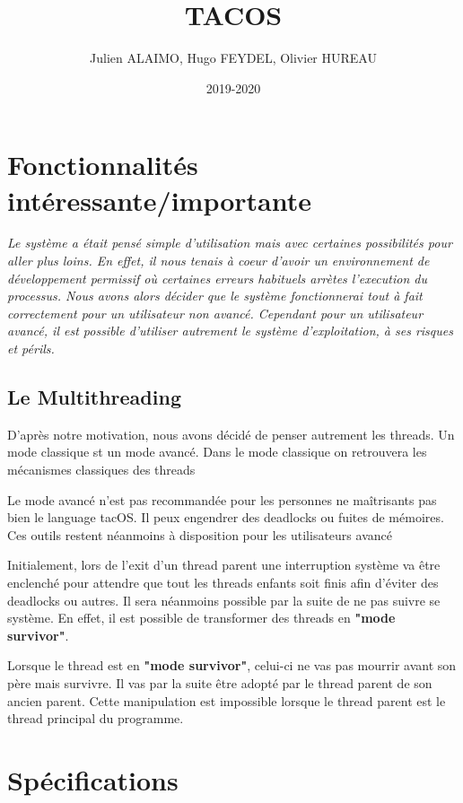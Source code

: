 \documentclass{article}
\title{TACOS}
\author{Julien ALAIMO, Hugo FEYDEL, Olivier HUREAU }
\date{2019-2020}
\begin{document}
\maketitle

\section{Fonctionnalités intéressante/importante}
\textit{
Le système a était pensé simple d'utilisation mais avec certaines possibilités pour aller plus loins. En effet, il nous tenais à coeur d'avoir un environnement de développement permissif où certaines erreurs habituels arrètes l'execution du processus. Nous avons alors décider que le système fonctionnerai tout à fait correctement pour un utilisateur non avancé. Cependant pour un utilisateur avancé, il est possible d'utiliser autrement le système d'exploitation, à ses risques et périls.
}

\subsection{Le Multithreading}

D'après notre motivation, nous avons décidé de penser autrement les threads. Un mode classique st un mode avancé. Dans le mode classique on retrouvera les mécanismes classiques des threads

Le mode avancé n'est pas recommandée pour les personnes ne maîtrisants pas bien le language tacOS. Il peux engendrer des deadlocks ou fuites de mémoires. Ces outils restent
 néanmoins à disposition pour les utilisateurs avancé
 
\vspace{5mm}


Initialement, lors de l'exit d'un thread parent une interruption système va être enclenché pour attendre que tout les threads enfants soit finis afin d'éviter des deadlocks ou autres. Il sera néanmoins possible par la suite de ne pas suivre se système.
En effet, il est possible de transformer des threads en \textbf{"mode survivor"}.

Lorsque le thread est en \textbf{"mode survivor"}, celui-ci ne vas pas mourrir avant son père mais survivre. Il vas par la suite être adopté par le thread parent de son ancien parent. 
Cette manipulation est impossible lorsque le thread parent est le thread principal du programme.

\newpage
\section{Spécifications}
\end{document}
